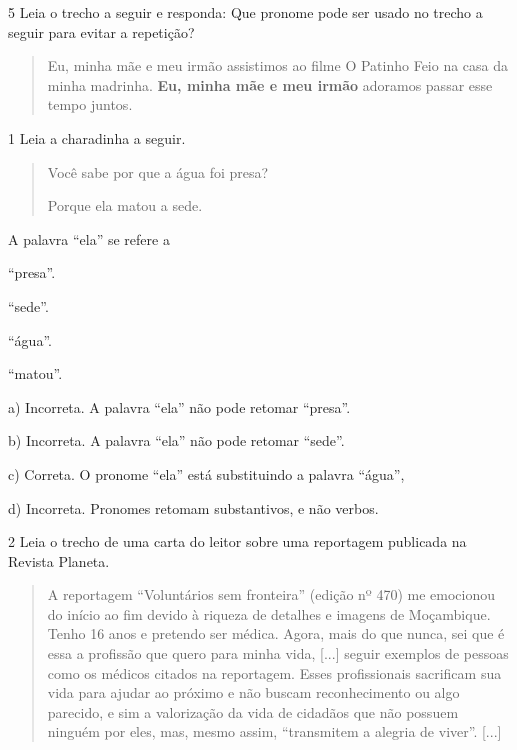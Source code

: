 \begin{escolha}
\begin{escolha}
\num{5} Leia o trecho a seguir e responda: Que pronome pode ser usado no trecho
a seguir para evitar a repetição?

\begin{quote}
Eu, minha mãe e meu irmão assistimos ao filme O Patinho Feio na casa da
minha madrinha. \textbf{Eu, minha mãe e meu irmão} adoramos passar esse
tempo juntos.
\end{quote}



\num{1} Leia a charadinha a seguir.

\begin{quote}
Você sabe por que a água foi presa?

Porque ela matou a sede.
\end{quote}

A palavra ``ela'' se refere a

\begin{escolha}
\item ``presa''.

\item ``sede''.

\item ``água''.

\item ``matou''.
\end{escolha}


a)  Incorreta. A palavra ``ela'' não pode retomar ``presa''.

b)  Incorreta. A palavra ``ela'' não pode retomar ``sede''.

c)  Correta. O pronome ``ela'' está substituindo a palavra ``água'',

d)  Incorreta. Pronomes retomam substantivos, e não verbos.

\num{2} Leia o trecho de uma carta do leitor sobre uma reportagem
publicada na Revista Planeta.

\begin{quote}
A reportagem ``Voluntários sem fronteira'' (edição nº 470) me emocionou
do início ao fim devido à riqueza de detalhes e imagens de Moçambique.
Tenho 16 anos e pretendo ser médica. Agora, mais do que nunca, sei que é
essa a profissão que quero para minha vida, {[}...{]} seguir exemplos de
pessoas como os médicos citados na reportagem. Esses profissionais
sacrificam sua vida para ajudar ao próximo e não buscam reconhecimento
ou algo parecido, e sim a valorização da vida de cidadãos que não
possuem ninguém por eles, mas, mesmo assim, ``transmitem a alegria de
viver''. {[}...{]}


\end{quote}
\end{escolha}
\end{escolha}
